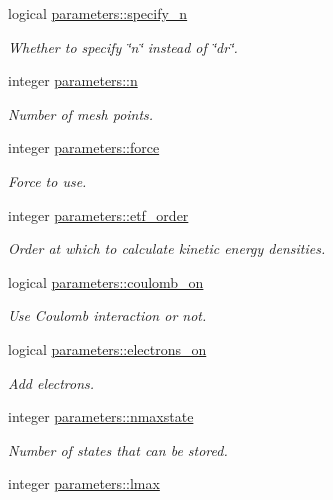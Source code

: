 \begin{DoxyCompactItemize}
logical \mbox{\hyperlink{group__INPUT__PARS_ga65180c8e25c7c66a7ef57b72282eaecf}{parameters\+::specify\+\_\+n}}
\begin{DoxyCompactList}\small\item\em Whether to specify \char`\"{}n\char`\"{} instead of \char`\"{}dr\char`\"{}. \end{DoxyCompactList}\item 
integer \mbox{\hyperlink{group__INPUT__PARS_ga2e69dbce49f3e83688fe80de2ce83724}{parameters\+::n}}
\begin{DoxyCompactList}\small\item\em Number of mesh points. \end{DoxyCompactList}\item 
integer \mbox{\hyperlink{group__INPUT__PARS_ga4f15a67f3875d8c184795f8d71ac08aa}{parameters\+::force}}
\begin{DoxyCompactList}\small\item\em Force to use. \end{DoxyCompactList}\item 
integer \mbox{\hyperlink{group__INPUT__PARS_ga47ccf97217bda004b76720993db73258}{parameters\+::etf\+\_\+order}}
\begin{DoxyCompactList}\small\item\em Order at which to calculate kinetic energy densities. \end{DoxyCompactList}\item 
logical \mbox{\hyperlink{group__INPUT__PARS_gadebedfbc56e0abdbb5f8152a34ec9654}{parameters\+::coulomb\+\_\+on}}
\begin{DoxyCompactList}\small\item\em Use Coulomb interaction or not. \end{DoxyCompactList}\item 
logical \mbox{\hyperlink{group__INPUT__PARS_gac0158c8c810d8b150e942815ae3a4478}{parameters\+::electrons\+\_\+on}}
\begin{DoxyCompactList}\small\item\em Add electrons. \end{DoxyCompactList}\item 
integer \mbox{\hyperlink{group__INPUT__PARS_gaa0c2ce3053c1f294c8fe21270389511f}{parameters\+::nmaxstate}}
\begin{DoxyCompactList}\small\item\em Number of states that can be stored. \end{DoxyCompactList}\item 
integer \mbox{\hyperlink{group__INPUT__PARS_gaee5c7e64e0f524d969ac1848094fdbac}{parameters\+::lmax}}

\end{DoxyCompactItemize}
